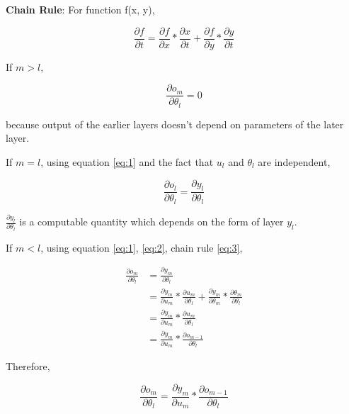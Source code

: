 \documentclass[a4paper]{tufte-handout}
\begin{document}
\begin{framed}
\textbf{Chain Rule}: For function f(x, y), 

\begin{equation}
\frac{\partial f}{\partial t} = \frac{\partial f}{\partial x} * \frac{\partial x}{\partial t} + \frac{\partial f}{\partial y} * \frac{\partial y}{\partial t}
\label{eq:3}
\end{equation}

\end{framed}

If \(m > l\),

\begin{equation}
\frac{\partial o_m}{\partial \theta_l} = 0 \label{eq:4}
\end{equation}


because output of the earlier layers doesn't depend on parameters of the later
layer.

If \(m = l\), using equation \eqref{eq:1} and the fact that \(u_l\) and
\(\theta_l\) are independent,

\begin{equation}
\frac{\partial o_l}{\partial \theta_l} = \frac{\partial y_l}{\partial \theta_l}
\label{eq:5}
\end{equation}

\(\frac{\partial y_l}{\partial \theta_l}\) is a computable quantity
which depends on the form of layer \(y_l\).

If \(m < l\), using equation \eqref{eq:1}, \eqref{eq:2}, chain rule \eqref{eq:3},

\begin{align*}
\frac{\partial o_m}{\partial \theta_l} &= \frac{\partial y_m}{\partial \theta_l}\\
&= \frac{\partial y_m}{\partial u_m} * \frac{\partial u_m}{\partial \theta_l} + \frac{\partial y_m}{\partial \theta_m} * \frac{\partial \theta_m}{\partial \theta_l}\\
&= \frac{\partial y_m}{\partial u_m} * \frac{\partial u_m}{\partial \theta_l}\\
&= \frac{\partial y_m}{\partial u_m} * \frac{\partial o_{m-1}}{\partial \theta_l}
\end{align*}


Therefore,

\begin{equation}
\frac{\partial o_m}{\partial \theta_l} = \frac{\partial y_m}{\partial u_m} * \frac{\partial o_{m-1}}{\partial \theta_l}
\label{eq:6}
\end{equation}
\end{document}

